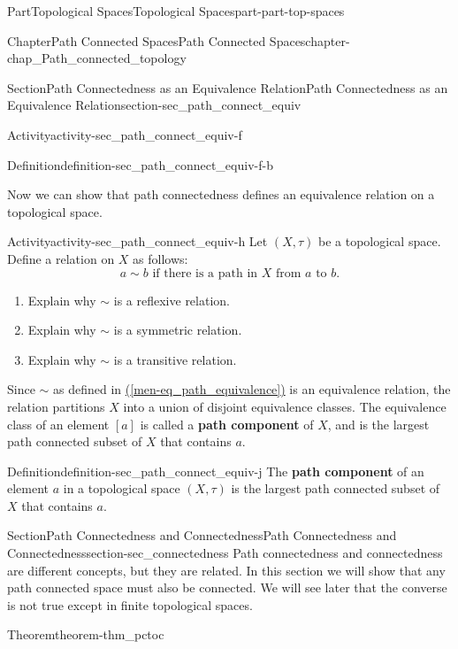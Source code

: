 \documentclass[oneside,10pt,]{book}
\newcommand{\xreffont}{\relax}
\newcommand{\terminology}[1]{\textbf{#1}}
\numberwithin{equation}{chapter}
\begin{document}
\begin{partptx}{Part}{Topological Spaces}{}{Topological Spaces}{}{}{part-part-top-spaces}
\begin{chapterptx}{Chapter}{Path Connected Spaces}{}{Path Connected Spaces}{}{}{chapter-chap_Path_connected_topology}
\begin{sectionptx}{Section}{Path Connectedness as an Equivalence Relation}{}{Path Connectedness as an Equivalence Relation}{}{}{section-sec_path_connect_equiv}
\begin{activity}{Activity}{}{activity-sec_path_connect_equiv-f}
\begin{definition}{Definition}{}{definition-sec_path_connect_equiv-f-b}
\begin{equation*}
\end{equation*}
%
\end{definition}
\end{activity}%
Now we can show that path connectedness defines an equivalence relation on a topological space.%
\begin{activity}{Activity}{}{activity-sec_path_connect_equiv-h}%
Let \((X,\tau)\) be a topological space. Define a relation on \(X\) as follows:%
\begin{equation}
a \sim b \text{ if there is a path in }  X \text{ from }  a \text{ to }  b\text{.}\label{men-eq_path_equivalence}
\end{equation}
%
\begin{enumerate}[font=\bfseries,label=(\alph*),ref=\alph*]%
\item{}Explain why \(\sim\) is a reflexive relation.%
\item{}Explain why \(\sim\) is a symmetric relation.%
\item{}Explain why \(\sim\) is a transitive relation.%
\end{enumerate}%
\end{activity}%
Since \(\sim\) as defined in \hyperref[men-eq_path_equivalence]{({\xreffont\ref{men-eq_path_equivalence}})} is an equivalence relation, the relation partitions \(X\) into a union of disjoint equivalence classes. The equivalence class of an element \([a]\) is called a \terminology{path component} of \(X\), and is the largest path connected subset of \(X\) that contains \(a\).%
\begin{definition}{Definition}{}{definition-sec_path_connect_equiv-j}%
%
The \terminology{path component} of an element \(a\) in a topological space \((X, \tau)\) is the largest path connected subset of \(X\) that contains \(a\).%
\end{definition}
\end{sectionptx}
%
%
\typeout{************************************************}
\typeout{************************************************}
%
\begin{sectionptx}{Section}{Path Connectedness and Connectedness}{}{Path Connectedness and Connectedness}{}{}{section-sec_connectedness}
Path connectedness and connectedness are different concepts, but they are related. In this section we will show that any path connected space must also be connected. We will see later that the converse is not true except in finite topological spaces.%
\begin{theorem}{Theorem}{}{}{theorem-thm_pctoc}%

\end{theorem}
\end{sectionptx}
\end{chapterptx}
\end{partptx}
\end{document}
